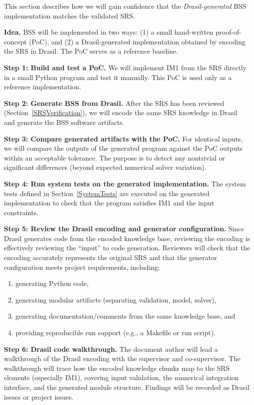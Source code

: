\documentclass[12pt, titlepage]{article}
\begin{document}
This section describes how we will gain confidence that the
\textit{Drasil-generated} BSS implementation matches the validated SRS.

\textbf{Idea.}
BSS will be implemented in two ways:
(1) a small hand-written proof-of-concept (PoC), and
(2) a Drasil-generated implementation obtained by encoding the SRS in Drasil.
The PoC serves as a reference baseline.

\textbf{Step 1: Build and test a PoC.}
We will implement IM1 from the SRS directly in a small Python program and test it
manually. This PoC is used only as a reference implementation.

\textbf{Step 2: Generate BSS from Drasil.}
After the SRS has been reviewed (Section~\ref{SRSVerification}), we will encode the same
SRS knowledge in Drasil and generate the BSS
software artifacts.

\textbf{Step 3: Compare generated artifacts with the PoC.}
For identical inputs, we will compare the outputs of the generated program
against the PoC outputs within an acceptable tolerance. The purpose is to
detect any nontrivial or significant differences (beyond expected numerical
solver variation).

\textbf{Step 4: Run system tests on the generated implementation.}
The system tests defined in Section~\ref{SystemTests} are executed on the
generated implementation to check that the program satisfies IM1 and the input
constraints.

\textbf{Step 5: Review the Drasil encoding and generator configuration.}
Since Drasil generates code from the encoded knowledge base, reviewing the
encoding is effectively reviewing the ``input'' to code generation. Reviewers
will check that the encoding accurately represents the original SRS and that
the generator configuration meets project requirements, including:
\begin{enumerate}
  \item generating Python code,
  \item generating modular artifacts (separating validation, model, solver),
  \item generating documentation/comments from the same knowledge base, and
  \item providing reproducible run support (e.g., a Makefile or run script).
\end{enumerate}

\textbf{Step 6: Drasil code walkthrough.}
The document author will lead a walkthrough of the Drasil encoding with the
supervisor and co-supervisor. The walkthrough will trace how the encoded
knowledge chunks map to the SRS elements (especially IM1), covering input
validation, the numerical integration interface, and the generated module
structure. Findings will be recorded as Drasil issues or project issues.
\end{document}
